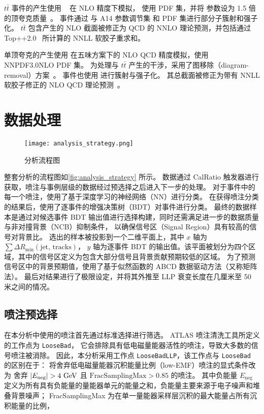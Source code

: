 $t\bar{t}$ 事件的产生使用 \POWHEGBOX[v2]~\cite{POWHEG_BOX} 在 NLO 精度下模拟，
使用 \NNPDF[3.0NLO] PDF 集，并将 \hdamp 参数设为 1.5 倍的顶夸克质量~\cite{ATL-PHYS-PUB-2016-020}。
事件通过 \Pythia[8.230] 与 A14 参数调节集 和 \NNPDF[2.3LO] PDF 集进行部分子簇射和强子化。
$t\bar{t}$ 包含产生的 NLO 截面被修正为 QCD 的 NNLO 理论预测，并包括通过 Top++2.0~\cite{Beneke:2011mq} 所计算的 NNLL 软胶子重求和。

单顶夸克的产生使用 \POWHEGBOX[v2] 在五味方案下的 NLO QCD 精度模拟，使用 NNPDF3.0NLO PDF 集。
为处理与 $t\bar{t}$ 产生的干涉，采用了图移除（diagram-removal）方案~\cite{Frixione:2008yi}。
事件也使用  进行簇射与强子化。
其总截面被修正为带有 NNLL 软胶子修正的 NLO QCD 理论预测~\cite{Aliev:2010zk}。


\section{数据处理}
\begin{figure}[ht]
    \centering
    \texttt{[image: analysis\_strategy.png]}
    \caption{分析流程图\cite{ATLAS:2022zhj}}
    \label{fig:analysis_strategy}
\end{figure}

整套分析的流程图如\autoref{fig:analysis_strategy} 所示。
数据通过 CalRatio 触发器进行获取，喷注与事例层级的数据经过预选择之后进入下一步的处理。
对于事件中的每一个喷注，使用了基于深度学习的神经网络（NN）进行分类。
在获得喷注分类的结果后，使用了逐事件的增强决策树（BDT）对事件进行分类。
最终的数据样本是通过对候选事件 BDT 输出值进行选择构建，同时还需满足进一步的数据质量与非对撞背景（NCB）抑制条件，
以确保信号区（Signal Region）具有较高的信号对背景比。
选出的样本被投影到一个二维平面上，其中 $x$ 轴为 $\sum \Delta R_{\min}(\text{jet, tracks})$，
$y$ 轴为逐事件 BDT 的输出值。该平面被划分为四个区域，其中的信号区定义为包含大部分信号且背景贡献预期较低的区域。
为了预测信号区中的背景预期值，使用了基于似然函数的 ABCD 数据驱动方法（又称矩阵法）。
最后对结果进行了极限设定，并将其外推至 LLP 衰变长度在几厘米至 50 米之间的情况。


\subsection{喷注预选择}
\label{sec:jet_preselection}

在本分析中使用的喷注首先通过标准选择进行筛选。
ATLAS 喷注清洗工具所定义的工作点为 \texttt{LooseBad}\cite{ATLAS-CONF-2015-029}，
它会排除具有低电磁量能器活性的喷注，导致大多数的信号喷注被消除。
因此，本分析采用工作点 \texttt{LooseBadLLP}，该工作点与 \texttt{LooseBad} 的区别在于：
将舍弃低电磁量能器沉积能量比例（low-EMF）喷注的显式条件改为
舍弃 $ |E_{\text{neg}}| > 4~\text{GeV} $ 且 \(\text{FracSamplingMax} > 0.85\) 的喷注。
其中负能量 $E_{\text{neg}}$ 定义为所有具有负能量的量能器单元的能量之和，负能量主要来源于电子噪声和堆叠背景噪声；
FracSamplingMax 为在单一量能器采样层沉积的最大能量占所有沉积能量的比例，

